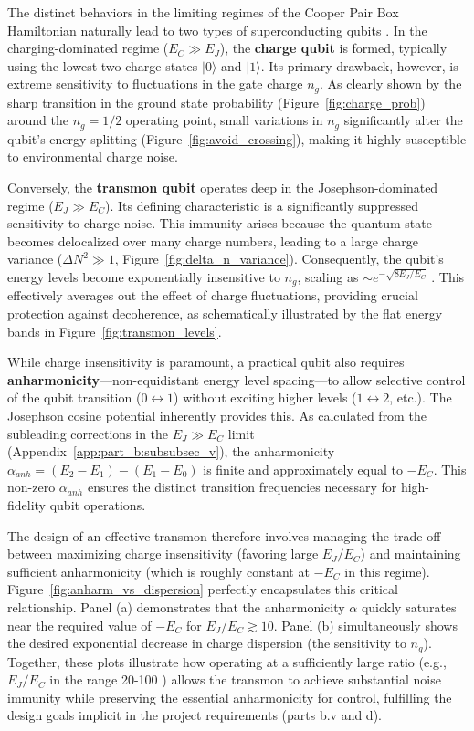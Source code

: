 \documentclass[12pt]{article}
\begin{document}
The distinct behaviors in the limiting regimes of the Cooper Pair Box Hamiltonian naturally lead to two types of superconducting qubits \cite{Koch2007, Kjaergaard2020}. In the charging-dominated regime ($E_C \gg E_J$), the \textbf{charge qubit} is formed, typically using the lowest two charge states $|0\rangle$ and $|1\rangle$. Its primary drawback, however, is extreme sensitivity to fluctuations in the gate charge $n_g$. As clearly shown by the sharp transition in the ground state probability (Figure~\ref{fig:charge_prob}) around the $n_g=1/2$ operating point, small variations in $n_g$ significantly alter the qubit's energy splitting (Figure~\ref{fig:avoid_crossing}), making it highly susceptible to environmental charge noise.

Conversely, the \textbf{transmon qubit} operates deep in the Josephson-dominated regime ($E_J \gg E_C$). Its defining characteristic is a significantly suppressed sensitivity to charge noise. This immunity arises because the quantum state becomes delocalized over many charge numbers, leading to a large charge variance ($\Delta N^2 \gg 1$, Figure~\ref{fig:delta_n_variance}). Consequently, the qubit's energy levels become exponentially insensitive to $n_g$, scaling as $\sim e^{-\sqrt{8E_J/E_C}}$ \cite{Koch2007}. This effectively averages out the effect of charge fluctuations, providing crucial protection against decoherence, as schematically illustrated by the flat energy bands in Figure~\ref{fig:transmon_levels}.

While charge insensitivity is paramount, a practical qubit also requires \textbf{anharmonicity}—non-equidistant energy level spacing—to allow selective control of the qubit transition ($0 \leftrightarrow 1$) without exciting higher levels ($1 \leftrightarrow 2$, etc.). The Josephson cosine potential inherently provides this. As calculated from the subleading corrections in the $E_J \gg E_C$ limit (Appendix~\ref{app:part_b:subsubsec_v}), the anharmonicity $\alpha_{anh} = (E_2-E_1) - (E_1-E_0)$ is finite and approximately equal to $-E_C$. This non-zero $\alpha_{anh}$ ensures the distinct transition frequencies necessary for high-fidelity qubit operations.

The design of an effective transmon therefore involves managing the trade-off between maximizing charge insensitivity (favoring large $E_J/E_C$) and maintaining sufficient anharmonicity (which is roughly constant at $-E_C$ in this regime). Figure~\ref{fig:anharm_vs_dispersion} perfectly encapsulates this critical relationship. Panel (a) demonstrates that the anharmonicity $\alpha$ quickly saturates near the required value of $-E_C$ for $E_J/E_C \gtrsim 10$. Panel (b) simultaneously shows the desired exponential decrease in charge dispersion (the sensitivity to $n_g$). Together, these plots illustrate how operating at a sufficiently large ratio (e.g., $E_J/E_C$ in the range 20-100 \cite{Kjaergaard2020}) allows the transmon to achieve substantial noise immunity while preserving the essential anharmonicity for control, fulfilling the design goals implicit in the project requirements (parts b.v and d).
\end{document}
